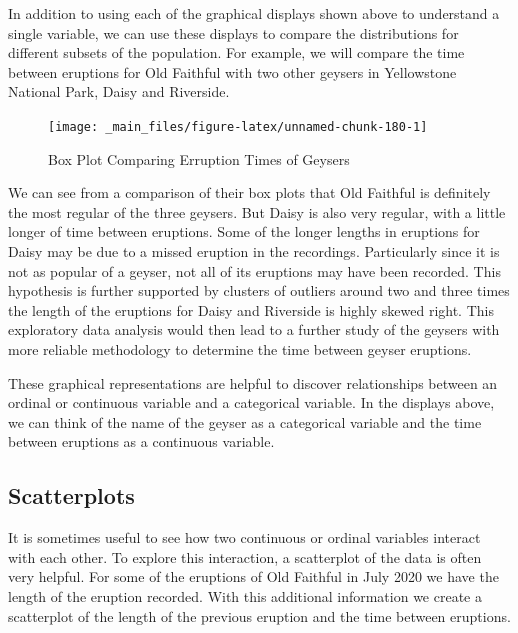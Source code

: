 \documentclass[
]{book}
\theoremstyle{definition}
\theoremstyle{definition}
\theoremstyle{definition}
\theoremstyle{definition}
\theoremstyle{remark}
\begin{document}
In addition to using each of the graphical displays shown above to understand a single variable, we can use these displays to compare the distributions for different subsets of the population. For example, we will compare the time between eruptions for Old Faithful with two other geysers in Yellowstone National Park, Daisy and Riverside.

\begin{figure}

{\centering \texttt{[image: \_main\_files/figure-latex/unnamed-chunk-180-1]} 

}

\caption{Box Plot Comparing Erruption Times of Geysers}\label{fig:unnamed-chunk-180}
\end{figure}

We can see from a comparison of their box plots that Old Faithful is definitely the most regular of the three geysers. But Daisy is also very regular, with a little longer of time between eruptions. Some of the longer lengths in eruptions for Daisy may be due to a missed eruption in the recordings. Particularly since it is not as popular of a geyser, not all of its eruptions may have been recorded. This hypothesis is further supported by clusters of outliers around two and three times the length of the eruptions for Daisy and Riverside is highly skewed right. This exploratory data analysis would then lead to a further study of the geysers with more reliable methodology to determine the time between geyser eruptions.

These graphical representations are helpful to discover relationships between an ordinal or continuous variable and a categorical variable. In the displays above, we can think of the name of the geyser as a categorical variable and the time between eruptions as a continuous variable.

\hypertarget{scatterplots}{%
\subsection{Scatterplots}\label{scatterplots}}

It is sometimes useful to see how two continuous or ordinal variables interact with each other. To explore this interaction, a scatterplot of the data is often very helpful. For some of the eruptions of Old Faithful in July 2020 we have the length of the eruption recorded. With this additional information we create a scatterplot of the length of the previous eruption and the time between eruptions.
\end{document}
